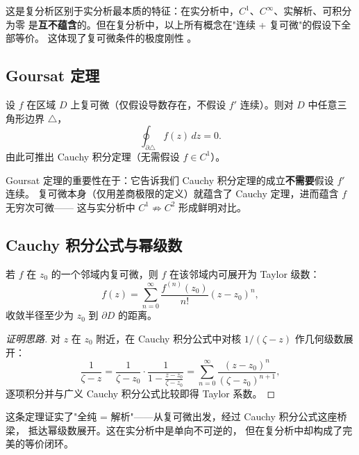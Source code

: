\begin{remark}
这是复分析区别于实分析最本质的特征：在实分析中，$C^1$、$C^\infty$、实解析、可积分为零
是\textbf{互不蕴含}的。但在复分析中，以上所有概念在"连续 + 复可微"的假设下全部等价。
这体现了复可微条件的极度刚性 。
\end{remark}

\subsection{Goursat 定理}

\begin{theorem}
设 $f$ 在区域 $D$ 上复可微（仅假设导数存在，不假设 $f'$ 连续）。则对 $D$ 中任意三角形边界 $\triangle$，
\[
  \oint_{\partial\triangle} f(z)\,dz = 0.
\]
由此可推出 Cauchy 积分定理（无需假设 $f \in C^1$）。
\end{theorem}

\begin{remark}
Goursat 定理的重要性在于：它告诉我们 Cauchy 积分定理的成立\textbf{不需要}假设 $f'$ 连续。
复可微本身（仅用差商极限的定义）就蕴含了 Cauchy 定理，进而蕴含 $f$ 无穷次可微——
这与实分析中 $C^1 \not\Rightarrow C^2$ 形成鲜明对比。
\end{remark}

\subsection{Cauchy 积分公式与幂级数}

\begin{theorem}[解析 $\Longleftrightarrow$ 全纯]
若 $f$ 在 $z_0$ 的一个邻域内复可微，则 $f$ 在该邻域内可展开为 Taylor 级数：
\[
  f(z) = \sum_{n=0}^{\infty} \frac{f^{(n)}(z_0)}{n!}(z - z_0)^n,
\]
收敛半径至少为 $z_0$ 到 $\partial D$ 的距离。
\end{theorem}

\begin{proof}[证明思路]
对 $z$ 在 $z_0$ 附近，在 Cauchy 积分公式中对核 $1/(\zeta-z)$ 作几何级数展开：
\[
  \frac{1}{\zeta - z}
  = \frac{1}{\zeta - z_0}\cdot\frac{1}{1 - \frac{z-z_0}{\zeta-z_0}}
  = \sum_{n=0}^{\infty} \frac{(z - z_0)^n}{(\zeta - z_0)^{n+1}},
\]
逐项积分并与广义 Cauchy 积分公式比较即得 Taylor 系数。
\end{proof}

\begin{remark}
这条定理证实了"全纯 = 解析"——从复可微出发，经过 Cauchy 积分公式这座桥梁，
抵达幂级数展开。这在实分析中是单向不可逆的，
但在复分析中却构成了完美的等价闭环。
\end{remark}
